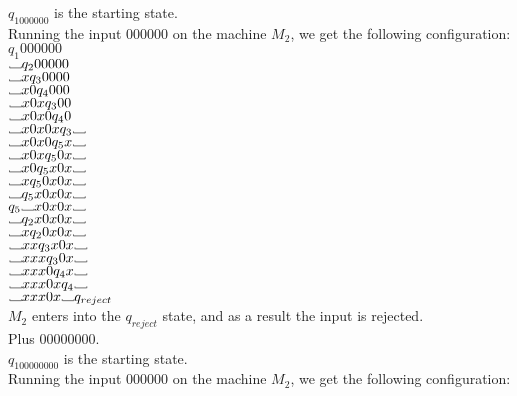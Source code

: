 \documentclass[12pt]{article}
\newcommand\Vtextvisiblespace[1][.8em]{%
	\mbox{\kern.07em\vrule height.3ex}%
	\vbox{\hrule width#1}%
	\hbox{\vrule height.3ex}}
\begin{document}
$q_1000000$ is the starting state. \\
Running the input 000000 on the machine $M_2$, we get the following configuration: \\

$q_1 000000$ \\
$\Vtextvisiblespace       q_2 00000 $  \\
$\Vtextvisiblespace x     q_3 0000 $ \\
$\Vtextvisiblespace x0    q_4 000 $ \\
$\Vtextvisiblespace x0x   q_3 00 $ \\
$\Vtextvisiblespace x0x0  q_4 0 $ \\
$\Vtextvisiblespace x0x0x q_3 \Vtextvisiblespace $ \\
$\Vtextvisiblespace x0x0  q_5 x \Vtextvisiblespace $ \\
$\Vtextvisiblespace x0x   q_5 0x \Vtextvisiblespace $ \\
$\Vtextvisiblespace x0    q_5 x0x \Vtextvisiblespace $ \\
$\Vtextvisiblespace x     q_5 0x0x \Vtextvisiblespace $ \\
$\Vtextvisiblespace       q_5 x0x0x \Vtextvisiblespace $ \\
$q_5 \Vtextvisiblespace x0x0x \Vtextvisiblespace $ \\
$\Vtextvisiblespace       q_2 x0x0x \Vtextvisiblespace $ \\
$\Vtextvisiblespace x     q_2 0x0x \Vtextvisiblespace $ \\
$\Vtextvisiblespace xx    q_3 x0x \Vtextvisiblespace $ \\
$\Vtextvisiblespace xxx   q_3 0x \Vtextvisiblespace $ \\
$\Vtextvisiblespace xxx0  q_4 x \Vtextvisiblespace $ \\
$\Vtextvisiblespace xxx0x q_4  \Vtextvisiblespace $ \\
$\Vtextvisiblespace xxx0x \Vtextvisiblespace q_{reject} $ \\
$M_2$ enters into the $q_{reject}$ state, and as a result the input is rejected. \\

\pagebreak
Plus 00000000. \\

$q_100000000$ is the starting state. \\
Running the input 000000 on the machine $M_2$, we get the following configuration: \\
\end{document}
